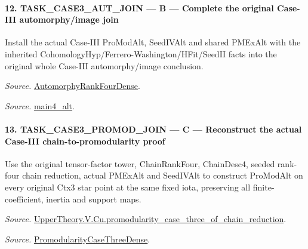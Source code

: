 \paragraph{12. TASK\_\allowbreak CASE3\_\allowbreak AUT\_\allowbreak JOIN — B — Complete the original Case-III automorphy/image join}

Install the actual Case-III ProModAlt, SeedIVAlt and shared PMExAlt with the inherited CohomologyHyp/Ferrero-Washington/HFit/SeedII facts into the original whole Case-III automorphy/image conclusion.

\emph{Source.} \href{https://github.com/CocoSgt/riemann-hypothesis-lean/blob/7cbf7a0c32fca1badf05931879a37c3f8a2b03b4/src/Development/AutomorphicArithmetic/AutomorphicVarieties/ModularityArgument/ThresholdArguments/DenseThresholdCases/PromodularityCaseThree.lean#L43-L44}{AutomorphyRankFourDense}.

\emph{Source.} \href{https://github.com/CocoSgt/riemann-hypothesis-lean/blob/7cbf7a0c32fca1badf05931879a37c3f8a2b03b4/src/Development/AutomorphicArithmetic/AutomorphicVarieties/ModularityArgument/ThresholdArguments/DenseThresholdCases/CuFinal.lean#L44-L44}{main4\_\allowbreak alt}.



\paragraph{13. TASK\_\allowbreak CASE3\_\allowbreak PROMOD\_\allowbreak JOIN — C — Reconstruct the actual Case-III chain-to-promodularity proof}

Use the original tensor-factor tower, ChainRankFour, ChainDesc4, seeded rank-four chain reduction, actual PMExAlt and SeedIVAlt to construct ProModAlt on every original Ctx3 star point at the same fixed iota, preserving all finite-coefficient, inertia and support maps.

\emph{Source.} \href{https://github.com/CocoSgt/riemann-hypothesis-lean/blob/7cbf7a0c32fca1badf05931879a37c3f8a2b03b4/src/Development/AutomorphicArithmetic/AutomorphicVarieties/ModularityArgument/ThresholdArguments/DenseThresholdCases/PromodularityCaseThreeOfLemmas.lean#L131-L153}{UpperTheory.V.Cu.promodularity\_\allowbreak case\_\allowbreak three\_\allowbreak of\_\allowbreak chain\_\allowbreak reduction}.

\emph{Source.} \href{https://github.com/CocoSgt/riemann-hypothesis-lean/blob/7cbf7a0c32fca1badf05931879a37c3f8a2b03b4/src/Development/AutomorphicArithmetic/AutomorphicVarieties/ModularityArgument/ThresholdArguments/DenseThresholdCases/PromodularityCaseThree.lean#L40-L42}{PromodularityCaseThreeDense}.



